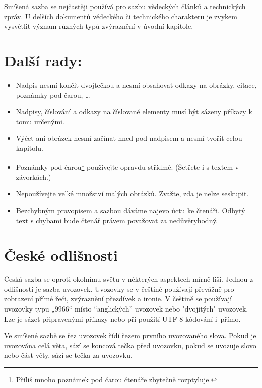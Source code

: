 \documentclass[twocolumn,a4paper,10pt]{article}
\begin{document}
Smíšená sazba se nejčastěji používá pro sazbu vědeckých článků a technických zpráv. U delších dokumentů vědeckého či technického charakteru je zvykem vysvětlit význam různých typů zvýraznění v úvodní kapitole.

\section{Další rady:}

\begin{itemize}
    \item Nadpis nesmí končit dvojtečkou a nesmí obsahovat odkazy na obrázky, citace, poznámky pod čarou, \dots
    \vfill

    \item Nadpisy, číslování a odkazy na číslované elementy musí být sázeny příkazy k tomu určenými.

    \item Výčet ani obrázek nesmí začínat hned pod nadpisem a nesmí tvořit celou kapitolu.

    \item Poznámky pod čarou\footnote{Příliš mnoho poznámek pod čarou čtenáře zbytečně rozptyluje.} používejte opravdu střídmě. (Šetřete i s textem v závorkách.)

    \item Nepoužívejte velké množství malých obrázků. Zvažte, zda je nelze seskupit.

    \item Bezchybným pravopisem a sazbou dáváme najevo úctu ke čtenáři. Odbytý text s chybami bude čtenář právem považovat za nedůvěryhodný.
    
\end{itemize}


\section{České odlišnosti}

\noindent Česká sazba se oproti okolnímu světu v některých aspektech mírně liší. Jednou z odlišností je sazba uvozovek. Uvozovky se v češtině používají převážně pro zobrazení přímé řeči, zvýraznění přezdívek a ironie. V češtině se používají uvozovky typu „9966“ místo “anglických”  uvozovek nebo "dvojitých" uvozovek. Lze je sázet připravenými příkazy nebo při použití UTF-8 kódování i~přímo.

Ve smíšené sazbě se řez uvozovek řídí řezem prvního uvozovaného slova. Pokud je uvozována celá věta, sází se koncová tečka před uvozovku, pokud se uvozuje slovo nebo část věty, sází se tečka za uvozovku.
\end{document}
